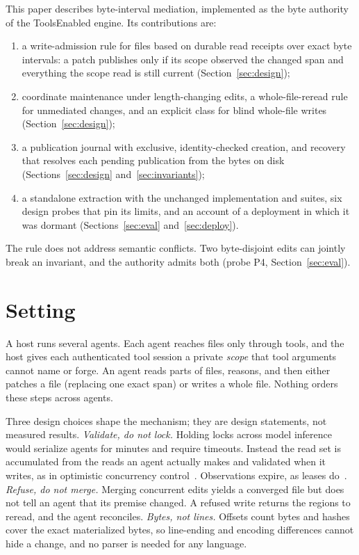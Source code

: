 \documentclass[10pt]{article}
\begin{document}
This paper describes byte-interval mediation, implemented as the byte authority of the ToolsEnabled engine. Its contributions are:
\begin{enumerate}
\item a write-admission rule for files based on durable read receipts over exact byte intervals: a patch publishes only if its scope observed the changed span and everything the scope read is still current (Section~\ref{sec:design});
\item coordinate maintenance under length-changing edits, a whole-file-reread rule for unmediated changes, and an explicit class for blind whole-file writes (Section~\ref{sec:design});
\item a publication journal with exclusive, identity-checked creation, and recovery that resolves each pending publication from the bytes on disk (Sections~\ref{sec:design} and~\ref{sec:invariants});
\item a standalone extraction with the unchanged implementation and suites, six design probes that pin its limits, and an account of a deployment in which it was dormant (Sections~\ref{sec:eval} and~\ref{sec:deploy}).
\end{enumerate}
The rule does not address semantic conflicts. Two byte-disjoint edits can jointly break an invariant, and the authority admits both (probe P4, Section~\ref{sec:eval}).

\section{Setting}\label{sec:setting}

A host runs several agents. Each agent reaches files only through tools, and the host gives each authenticated tool session a private \emph{scope} that tool arguments cannot name or forge. An agent reads parts of files, reasons, and then either patches a file (replacing one exact span) or writes a whole file. Nothing orders these steps across agents.

Three design choices shape the mechanism; they are design statements, not measured results.
\emph{Validate, do not lock.} Holding locks across model inference would serialize agents for minutes and require timeouts. Instead the read set is accumulated from the reads an agent actually makes and validated when it writes, as in optimistic concurrency control~\citep{kung1981optimistic}. Observations expire, as leases do~\citep{gray1989leases}.
\emph{Refuse, do not merge.} Merging concurrent edits yields a converged file but does not tell an agent that its premise changed. A refused write returns the regions to reread, and the agent reconciles.
\emph{Bytes, not lines.} Offsets count bytes and hashes cover the exact materialized bytes, so line-ending and encoding differences cannot hide a change, and no parser is needed for any language.
\end{document}
